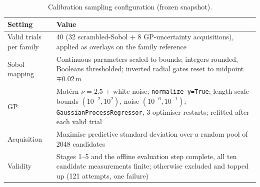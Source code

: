 \documentclass[a4paper,fleqn]{cas-dc}
\begin{document}
\begin{table}[t]
\caption{Calibration sampling configuration (frozen snapshot).}\label{tab:bo-config}
\small
\begin{tabular*}{\textwidth}{@{\extracolsep{\fill}} l Y{0.72\textwidth} @{}}
\toprule
Setting & Value \\
\midrule
Valid trials per family & 40 (32 scrambled-Sobol $+$ 8 GP-uncertainty acquisitions), applied as overlays on the family reference \\
Sobol mapping & Continuous parameters scaled to bounds; integers rounded, Booleans thresholded; inverted radial gates reset to midpoint $\mp0.02$\,m \\
GP & Mat\'ern $\nu=2.5$ $+$ white noise; \texttt{normalize\_y=True}; length-scale bounds $(10^{-2},10^{2})$, noise $(10^{-6},10^{-1})$; \texttt{GaussianProcessRegressor}, 3 optimiser restarts; refitted after each valid trial \\
Acquisition & Maximise predictive standard deviation over a random pool of 2048 candidates \\
Validity & Stages 1--5 and the offline evaluation step complete, all ten candidate measurements finite; otherwise excluded and topped up (121 attempts, one failure) \\
\bottomrule
\end{tabular*}
\end{table}
\end{document}
